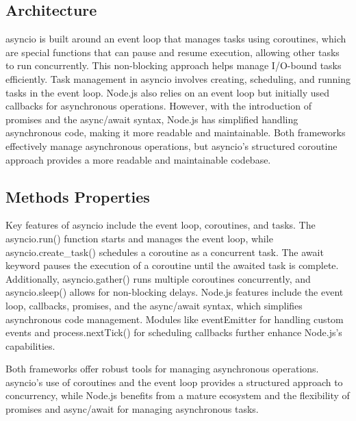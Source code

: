 \documentclass[letterpaper,twocolumn,10pt]{article}
\begin{document}
\subsection{Architecture}
asyncio is built around an event loop that manages tasks using coroutines, which are special functions that can pause and resume execution, allowing other tasks to run concurrently. This non-blocking approach helps manage I/O-bound tasks efficiently. Task management in asyncio involves creating, scheduling, and running tasks in the event loop. Node.js also relies on an event loop but initially used callbacks for asynchronous operations. However, with the introduction of promises and the async/await syntax, Node.js has simplified handling asynchronous code, making it more readable and maintainable. Both frameworks effectively manage asynchronous operations, but asyncio’s structured coroutine approach provides a more readable and maintainable codebase.

\subsection{Methods Properties}
Key features of asyncio include the event loop, coroutines, and tasks. The asyncio.run() function starts and manages the event loop, while asyncio.create\_task() schedules a coroutine as a concurrent task. The await keyword pauses the execution of a coroutine until the awaited task is complete. Additionally, asyncio.gather() runs multiple coroutines concurrently, and asyncio.sleep() allows for non-blocking delays. Node.js features include the event loop, callbacks, promises, and the async/await syntax, which simplifies asynchronous code management. Modules like eventEmitter for handling custom events and process.nextTick() for scheduling callbacks further enhance Node.js’s capabilities.
\vspace{5pt}

\noindent{}Both frameworks offer robust tools for managing asynchronous operations. asyncio’s use of coroutines and the event loop provides a structured approach to concurrency, while Node.js benefits from a mature ecosystem and the flexibility of promises and async/await for managing asynchronous tasks.

\end{document}
